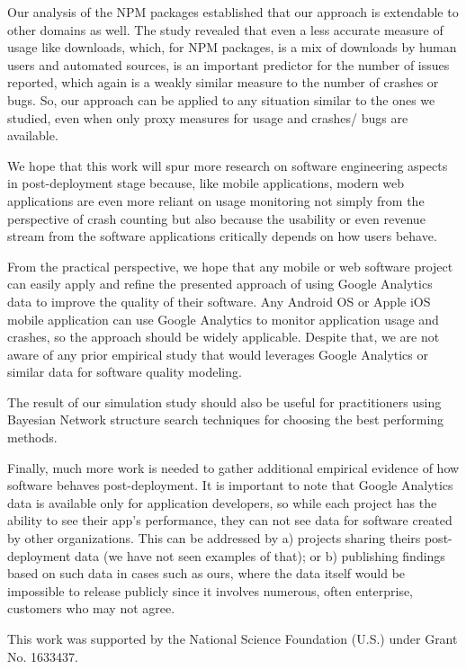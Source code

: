 \documentclass[smallcondensed]{svjour3}     %
\begin{document}
Our analysis of the NPM packages established that our approach is extendable to other domains as well. 
The study revealed that even a less accurate measure of usage like downloads, which, for NPM packages, 
is a mix of downloads by human users and automated sources, is an important predictor for the number 
of issues reported, which again is a weakly similar measure to the number of crashes or bugs. 
So, our approach can be applied to any situation similar to the ones we studied, even when only 
proxy measures for usage and crashes/ bugs are available.

We hope that this work will spur more research on software engineering
aspects in post-deployment stage because, like mobile applications, 
modern web applications are even more reliant on usage monitoring not
simply from the perspective of crash counting but also because the
usability or even revenue stream from the software applications
critically depends on how users behave. 

From the practical perspective, we hope that any mobile or web
software project can easily apply and refine the presented approach
of using Google Analytics data to improve the quality of their
software.  Any Android OS or Apple iOS mobile application can use
Google Analytics to monitor application usage and crashes, so the
approach should be widely applicable. Despite that, we 
are not aware of any prior empirical study that would leverages Google
Analytics or similar data for software quality modeling.

The result of our simulation study should also be useful for practitioners 
using Bayesian Network structure search techniques for choosing the best performing methods.


Finally, much more work is needed to gather additional empirical
evidence of how software behaves post-deployment. It is important to
note that Google Analytics data is available only for application
developers, so while each project has the ability to see their app's
performance, they can not see data for software created by other
organizations. This can be addressed by a) projects sharing theirs
post-deployment data (we have not seen examples of that); or b)
publishing findings based on such data in cases such as ours,
where the data itself would be impossible to release publicly since
it involves numerous, often enterprise, customers who may not agree.




\begin{acknowledgements}
This work was supported by the National Science Foundation (U.S.) under Grant No. 1633437.
\end{acknowledgements}
\vspace{-10pt}
\end{document}
